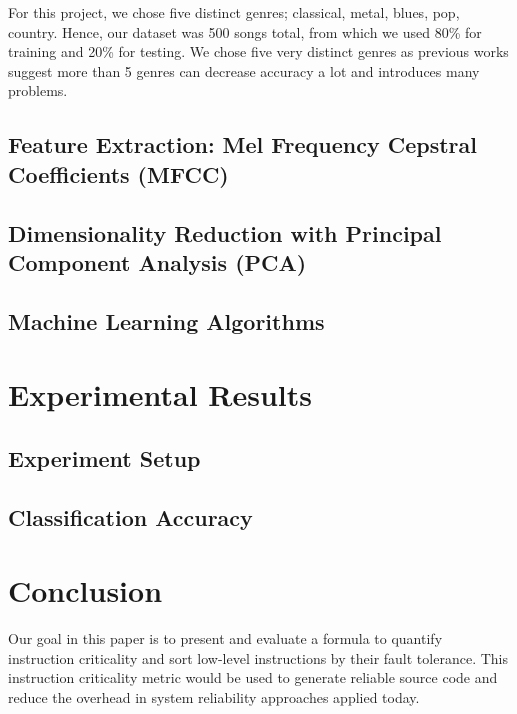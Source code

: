 For this project, we chose five distinct genres; classical, metal, blues, pop, country. Hence, our dataset was 500 songs total, from which we used 80\% for training and 20\% for testing. We chose five very distinct genres as previous works \cite{Chun:2010} suggest more than 5 genres can decrease accuracy a lot and introduces many problems. 

\subsection{Feature Extraction: Mel Frequency Cepstral Coefficients (MFCC)}

\subsection{Dimensionality Reduction with Principal Component Analysis (PCA)}

\subsection{Machine Learning Algorithms}

\section{Experimental Results}\label{sec:results}

\subsection{Experiment Setup}

\subsection{Classification Accuracy}

\section{Conclusion}\label{sec:conclusion}


Our goal in this paper is to present and evaluate a formula to quantify instruction criticality and sort low-level instructions by their fault tolerance. This instruction criticality metric would be used to generate reliable source code and reduce the overhead in system reliability approaches applied today. 

